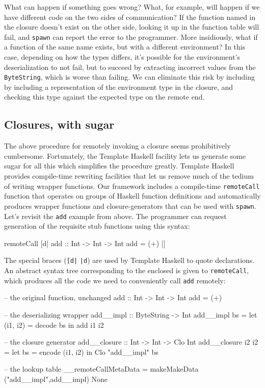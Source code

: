 \documentclass[preprint]{sigplanconf}
\begin{document}
What can happen if something goes wrong? What, for example, will happen if we have different code on the two sides of communication? If the function named in the closure doesn't exist on the other side, looking it up in the function table will fail, and \texttt{spawn} can report the error to the programmer. More insidiously, what if a function of the same name exists, but with a different environment? In this case, depending on how the types differs, it's possible for the environment's deserialization to not fail, but to succeed by extracting incorrect values from the \texttt{ByteString}, which is worse than failing. We can eliminate this risk by including by including a representation of the environment type in the closure, and checking this type against the expected type on the remote end.


\subsection{Closures, with sugar}

The above procedure for remotely invoking a closure seems prohibitively cumbersome. Fortunately, the Template Haskell facility lets us generate some sugar for all this which simplifies the procedure greatly. Template Haskell provides compile-time rewriting facilities that let us remove much of the tedium of writing wrapper functions. Our framework includes a compile-time \texttt{remoteCall} function that operates on groups of Haskell function definitions and automatically produces wrapper functions and closure-generators that can be used with \texttt{spawn}. Let's revisit the \texttt{add} example from above. The programmer can request generation of the requisite stub functions using this syntax:

\begin{code}
remoteCall
  [d|
    add :: Int -> Int -> Int
    add = (+)
  |]
\end{code}

The special braces (\texttt{[d|} \texttt{|d}) are used by Template Haskell to quote declarations. An abstract syntax tree corresponding to the enclosed is given to \texttt{remoteCall}, which produces all the code we need to conveniently call \texttt{add} remotely:

\begin{code}
-- the original function, unchanged
add :: Int -> Int -> Int
add = (+)

-- the deserializing wrapper
add__impl :: ByteString -> Int
add__impl bs = let (i1, i2) = decode bs
                in add i1 i2

-- the closure generator
add__closure :: Int -> Int -> Clo Int
add__closure i2 i2 = let bs = encode (i1, i2)
                      in Clo "add__impl" bs

-- the lookup table
__remoteCallMetaData = makeMakeData ("add__impl",add__impl) None
\end{code}
\end{document}
